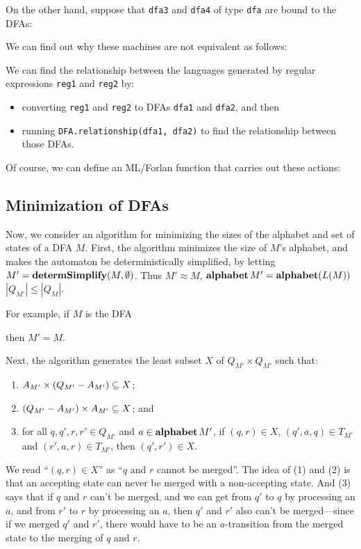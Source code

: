 On the other hand, suppose that \texttt{dfa3} and \texttt{dfa4} of type
\texttt{dfa} are bound to the DFAs:
\begin{center}

\end{center}
We can find out why these machines are not equivalent as follows:


We can find the relationship between the languages generated by regular
expressions \texttt{reg1} and \texttt{reg2} by:
\begin{itemize}
\item  converting \texttt{reg1} and \texttt{reg2} to DFAs
\texttt{dfa1} and \texttt{dfa2}, and then

\item  running \texttt{DFA.relationship(dfa1, dfa2)} to find
the relationship between those DFAs.
\end{itemize}

Of course, we can define an ML/Forlan function that
carries out these actions:


\subsection{Minimization of DFAs}

%

Now, we consider an algorithm for minimizing the sizes of the alphabet
and set of states of a DFA $M$.  First, the algorithm minimizes the
size of $M$'s alphabet, and makes the automaton be deterministically
simplified, by letting $M'=\mathbf{determSimplify}(M,\emptyset)$.  Thus
$M'\approx M$, $\mathbf{alphabet}\,M'=\mathbf{alphabet}(L(M))$ $|Q_{M'}|\leq|Q_M|$.

For example, if $M$ is the DFA
\begin{center}

\end{center}
then $M'=M$.

Next, the algorithm generates the least subset $X$ of $Q_{M'}\times
Q_{M'}$ such that:
\begin{enumerate}[\quad(1)]
\item $A_{M'}\times(Q_{M'}-A_{M'})\subseteq X$;

\item $(Q_{M'}-A_{M'})\times A_{M'}\subseteq X$; and

\item for all $q,q',r,r'\in Q_{M'}$ and $a\in\mathbf{alphabet}\,M'$,
if $(q,r)\in X$, $(q',a, q)\in T_{M'}$ and $(r',a, r)\in T_{M'}$, then
$(q',r')\in X$.
\end{enumerate}
We read ``$(q,r)\in X$'' as ``$q$ and $r$ cannot be merged''.
The idea of (1) and (2) is that an accepting state can never be merged
with a non-accepting state.  And (3) says that if $q$ and $r$ can't
be merged, and we can get from $q'$ to $q$ by processing an $a$, and
from $r'$ to $r$ by processing an $a$, then
$q'$ and $r'$ also can't be merged---since if we merged $q'$ and $r'$,
there would have to be an $a$-transition from the merged state
to the merging of $q$ and $r$.

